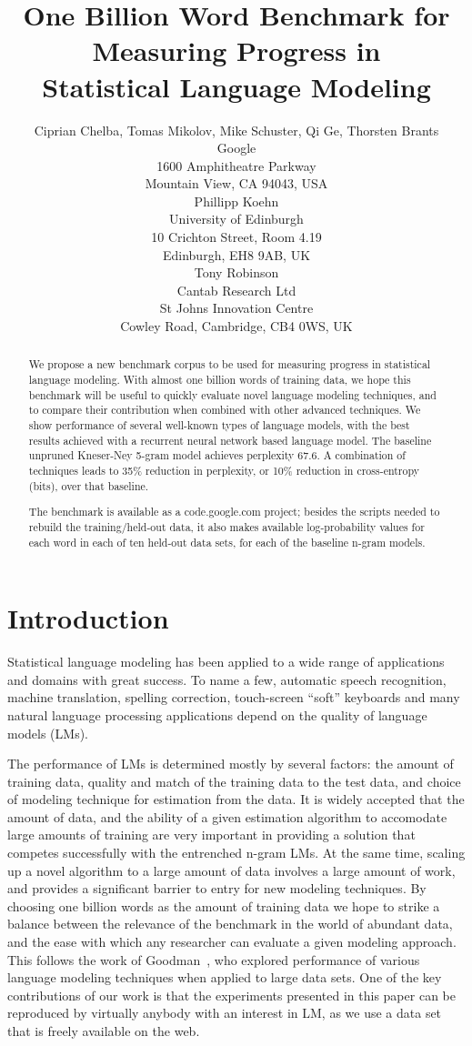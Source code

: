 \documentclass[11pt,letterpaper]{article}
\title{One Billion Word Benchmark for Measuring Progress in\\
Statistical Language Modeling}
\author{Ciprian Chelba, Tomas Mikolov, Mike Schuster, Qi Ge, Thorsten Brants\\
  Google\\
  1600 Amphitheatre Parkway\\
  Mountain View, CA 94043, USA\\
  \AND Phillipp Koehn\\
  University of Edinburgh\\
  10 Crichton Street, Room 4.19\\
  Edinburgh, EH8 9AB, UK\\
  \And Tony Robinson\\
  Cantab Research Ltd\\
  St Johns Innovation Centre\\
  Cowley Road, Cambridge, CB4 0WS, UK\\
}
\begin{document}
\maketitle
\begin{abstract}
We propose a new benchmark corpus to be used for measuring progress in statistical language modeling.
With almost one billion words of training data, we hope this benchmark will be useful
to quickly evaluate novel language modeling techniques, and to compare their contribution
when combined with other advanced techniques. We show performance of several well-known
types of language models, with the best results achieved with a recurrent neural network
based language model. The baseline unpruned Kneser-Ney 5-gram model achieves perplexity 67.6.
A combination of techniques leads to 35\% reduction in perplexity, or 10\% reduction in
cross-entropy (bits), over that baseline.

The benchmark is available as a code.google.com project; besides the scripts needed to
rebuild the training/held-out data, it also makes available log-probability values for
each word in each of ten held-out data sets, for each of the baseline n-gram models.

\end{abstract}

\section{Introduction}

Statistical language modeling has been applied to a wide range of applications and domains with great success. 
To name a few, automatic speech recognition, machine translation, spelling correction, 
touch-screen ``soft'' keyboards and many natural language processing applications depend on the quality of 
language models (LMs).

The performance of LMs is determined mostly by several factors: the amount of
training data, quality and match of the training data to the test data, and choice of modeling technique for estimation from the data. It is widely accepted that the amount of data, and the ability of a given estimation algorithm to accomodate large amounts of training are very important in providing a solution that competes successfully with the entrenched n-gram LMs. At the same time, scaling up a novel algorithm to a large amount of data involves a large amount of work, and provides a significant barrier to entry for new modeling techniques. By choosing one billion words as the amount of training data we hope to strike a balance between the relevance of the benchmark in the world of abundant data, and the ease with which any researcher can evaluate a given modeling approach. This follows the work of Goodman~, who explored performance of various language modeling techniques when applied to large data sets. One of the key contributions of our work is that the experiments presented in this paper can be reproduced by virtually anybody with an interest in LM, as we use a data set that is freely available on the web.
\end{document}
